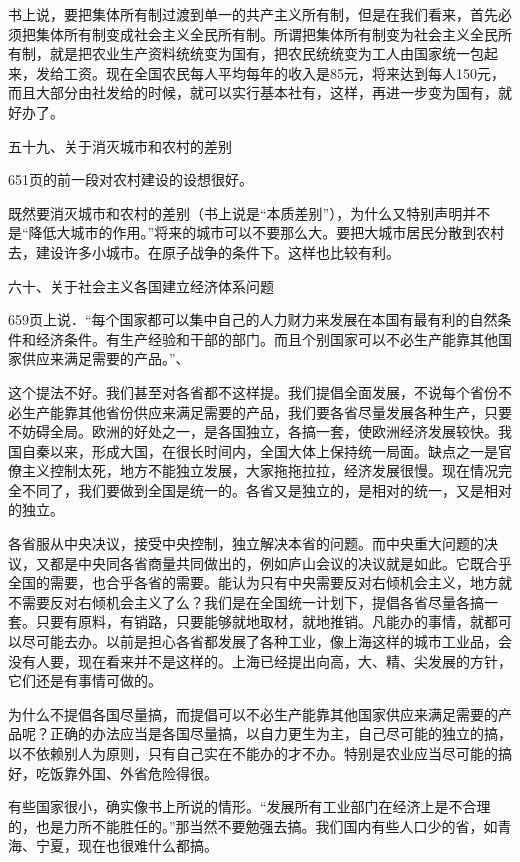 书上说，要把集体所有制过渡到单一的共产主义所有制，但是在我们看来，首先必须把集体所有制变成社会主义全民所有制。所谓把集体所有制变为社会主义全民所有制，就是把农业生产资料统统变为国有，把农民统统变为工人由国家统一包起来，发给工资。现在全国农民每人平均每年的收入是85元，将来达到每人150元，而且大部分由社发给的时候，就可以实行基本社有，这样，再进一步变为国有，就好办了。

五十九、关于消灭城市和农村的差别

651页的前一段对农村建设的设想很好。

既然要消灭城市和农村的差别（书上说是“本质差别”），为什么又特别声明并不是“降低大城市的作用。”将来的城市可以不要那么大。要把大城市居民分散到农村去，建设许多小城市。在原子战争的条件下。这样也比较有利。

六十、关于社会主义各国建立经济体系问题

659页上说．“每个国家都可以集中自己的人力财力来发展在本国有最有利的自然条件和经济条件。有生产经验和干部的部门。而且个别国家可以不必生产能靠其他国家供应来满足需要的产品。”、

这个提法不好。我们甚至对各省都不这样提。我们提倡全面发展，不说每个省份不必生产能靠其他省份供应来满足需要的产品，我们要各省尽量发展各种生产，只要不妨碍全局。欧洲的好处之一，是各国独立，各搞一套，使欧洲经济发展较快。我国自秦以来，形成大国，在很长时间内，全国大体上保持统一局面。缺点之一是官僚主义控制太死，地方不能独立发展，大家拖拖拉拉，经济发展很慢。现在情况完全不同了，我们要做到全国是统一的。各省又是独立的，是相对的统一，又是相对的独立。

各省服从中央决议，接受中央控制，独立解决本省的问题。而中央重大问题的决议，又都是中央同各省商量共同做出的，例如庐山会议的决议就是如此。它既合乎全国的需要，也合乎各省的需要。能认为只有中央需要反对右倾机会主义，地方就不需要反对右倾机会主义了么？我们是在全国统一计划下，提倡各省尽量各搞一套。只要有原料，有销路，只要能够就地取材，就地推销。凡能办的事情，就都可以尽可能去办。以前是担心各省都发展了各种工业，像上海这样的城市工业品，会没有人要，现在看来并不是这样的。上海已经提出向高，大、精、尖发展的方针，它们还是有事情可做的。

为什么不提倡各国尽量搞，而提倡可以不必生产能靠其他国家供应来满足需要的产品呢？正确的办法应当是各国尽量搞，以自力更生为主，自己尽可能的独立的搞，以不依赖别人为原则，只有自己实在不能办的才不办。特别是农业应当尽可能的搞好，吃饭靠外国、外省危险得很。

有些国家很小，确实像书上所说的情形。“发展所有工业部门在经济上是不合理的，也是力所不能胜任的。”那当然不要勉强去搞。我们国内有些人口少的省，如青海、宁夏，现在也很难什么都搞。

